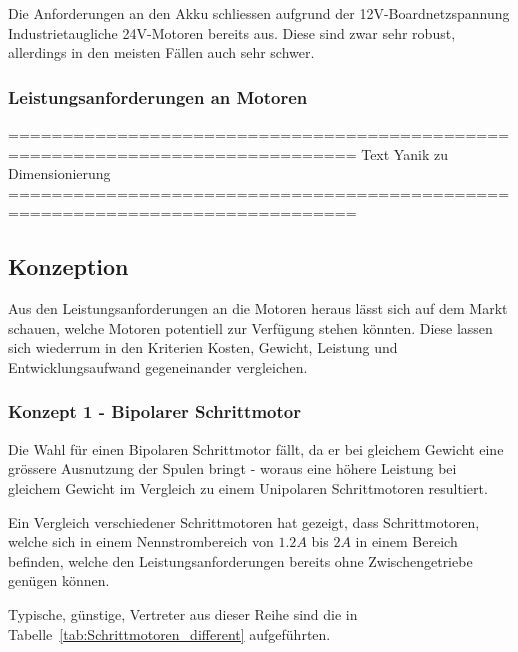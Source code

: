 \documentclass[main.tex]{subfiles} %
\begin{document}
Die Anforderungen an den Akku schliessen aufgrund der 12V-Boardnetzspannung
Industrietaugliche 24V-Motoren bereits aus. Diese sind zwar sehr robust,
allerdings in den meisten Fällen auch sehr schwer.

\subsubsection*{Leistungsanforderungen an Motoren}

==============================================================================
Text Yanik zu Dimensionierung
==============================================================================

\subsection*{Konzeption}

Aus den Leistungsanforderungen an die Motoren heraus lässt sich auf dem Markt
schauen, welche Motoren potentiell zur Verfügung stehen könnten. Diese lassen
sich wiederrum in den Kriterien Kosten, Gewicht, Leistung und
Entwicklungsaufwand gegeneinander vergleichen.

\subsubsection*{Konzept 1 - Bipolarer Schrittmotor} %

Die Wahl für einen Bipolaren Schrittmotor fällt, da er bei gleichem Gewicht
eine grössere Ausnutzung der Spulen bringt - woraus eine höhere Leistung bei
gleichem Gewicht im Vergleich zu einem Unipolaren Schrittmotoren resultiert.

Ein Vergleich verschiedener Schrittmotoren hat gezeigt, dass Schrittmotoren,
welche sich in einem Nennstrombereich von $1.2A$ bis $2A$ in einem Bereich
befinden, welche den Leistungsanforderungen bereits ohne Zwischengetriebe
genügen können.

Typische, günstige, Vertreter aus dieser Reihe sind die in
Tabelle~\ref{tab:Schrittmotoren_different} aufgeführten.
\end{document}
